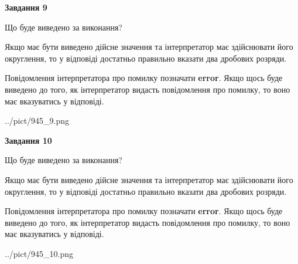 \documentclass[12pt, ukrainian]{article}
\begin{document}
{\begin {Large}
{\begin {center}\textbf{Завдання 9}\end {center}}\par
Що буде виведено за виконання? \par

Якщо має бути виведено дійсне значення та інтерпретатор має здійснювати його округлення, 
то у відповіді достатньо правильно вказати два дробових розряди.

Повідомлення інтерпретатора про помилку позначати \textbf{error}.
Якщо щось буде виведено до того, як інтерпретатор видасть повідомлення про помилку, 
то воно має вказуватись у відповіді. \par

\begin{center}
	{../pict/945_9.png}
\end{center}
\newpage

{\begin {center}\textbf{Завдання 10}\end {center}}\par
Що буде виведено за виконання? \par

Якщо має бути виведено дійсне значення та інтерпретатор має здійснювати його округлення, 
то у відповіді достатньо правильно вказати два дробових розряди.

Повідомлення інтерпретатора про помилку позначати \textbf{error}.
Якщо щось буде виведено до того, як інтерпретатор видасть повідомлення про помилку, 
то воно має вказуватись у відповіді. \par

\begin{center}
	{../pict/945_10.png}
\end{center}
\newpage

\end {Large}}
\end{document}
